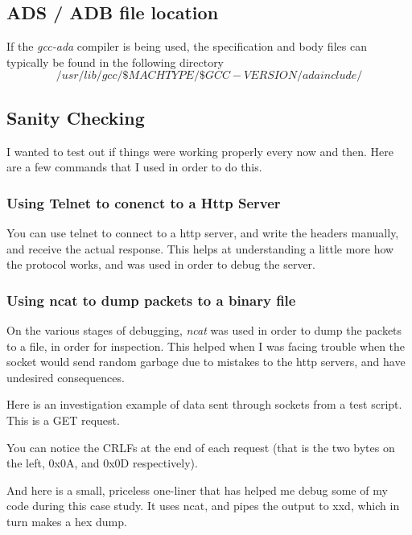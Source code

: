 \subsection{ADS / ADB file location}
If the \textit{gcc-ada} compiler is being used, the specification and body files can typically be found in the following directory
$$ /usr/lib/gcc/\$MACHTYPE/\$GCC-VERSION/adainclude/ $$

\subsection{Sanity Checking}
I wanted to test out if things were working properly every now and then. Here are a few commands that I used in order to do this.

\subsubsection{Using Telnet to conenct to a Http Server}
You can use telnet to connect to a http server, and write the headers manually, and receive the actual response. This helps at understanding a little more how the protocol works, and was used in order to debug the server.
\\


\subsubsection{Using ncat to dump packets to a binary file}
On the various stages of debugging, \textit{ncat} was used in order to dump the packets to a file, in order for inspection. This helped when I was facing trouble when the socket would send random garbage due to mistakes to the http servers, and have undesired consequences. 



Here is an investigation example of data sent through sockets from a test script. This is a GET request.

You can notice the CRLFs at the end of each request (that is the two bytes on the left, 0x0A, and 0x0D respectively).

And here is a small, priceless one-liner that has helped me debug some of my code during this case study. It uses ncat, and pipes the output to xxd, which in turn makes a hex dump.

